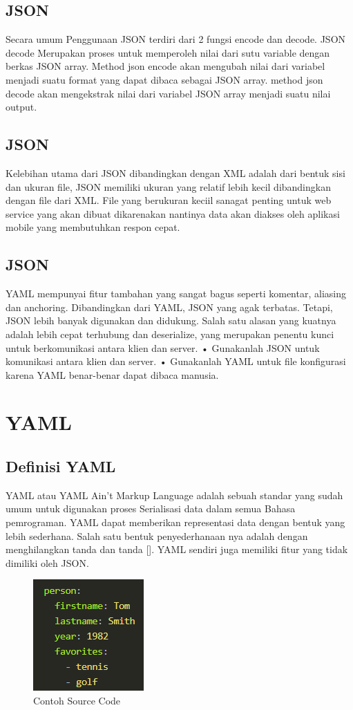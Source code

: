\documentclass[a4paper]{article}
\begin{document}
\subsection{JSON}
Secara umum Penggunaan JSON terdiri dari 2 fungsi encode dan decode.  JSON decode Merupakan proses untuk  memperoleh nilai dari sutu variable dengan berkas JSON array. Method json encode akan mengubah nilai dari variabel  menjadi suatu format yang dapat dibaca sebagai JSON array. method json decode  akan mengekstrak nilai dari variabel JSON array  menjadi suatu nilai output.
\subsection{JSON}
Kelebihan utama dari JSON dibandingkan dengan XML adalah dari bentuk sisi dan ukuran file, JSON memiliki ukuran yang relatif  lebih kecil dibandingkan dengan file dari XML. File yang berukuran keciil sanagat penting untuk web service yang akan dibuat dikarenakan nantinya data akan diakses oleh aplikasi mobile yang membutuhkan respon cepat.
\subsection{JSON}
YAML mempunyai fitur tambahan yang sangat bagus seperti komentar, aliasing dan anchoring.  Dibandingkan dari YAML, JSON yang agak terbatas. Tetapi, JSON lebih banyak digunakan dan didukung. Salah satu alasan yang kuatnya adalah lebih cepat terhubung dan deserialize, yang merupakan penentu kunci untuk berkomunikasi antara klien dan server.
•	Gunakanlah JSON untuk komunikasi antara klien dan server.
•	Gunakanlah YAML untuk file konfigurasi karena YAML benar-benar dapat dibaca manusia.
\section{YAML}
\subsection{Definisi YAML}
YAML atau YAML Ain't Markup Language adalah sebuah standar yang sudah umum untuk digunakan proses Serialisasi data dalam semua Bahasa pemrograman. YAML dapat memberikan representasi data dengan bentuk yang lebih sederhana. Salah satu bentuk penyederhanaan nya adalah dengan menghilangkan tanda {} dan tanda []. YAML sendiri juga memiliki fitur yang tidak dimiliki oleh JSON.
\begin{figure}[ht]
\centerline{\includegraphics[scale=1]{../figures/5SC.png} }

\caption{Contoh Source Code} 
\label{Sc}
\end{figure}
\end{document}
